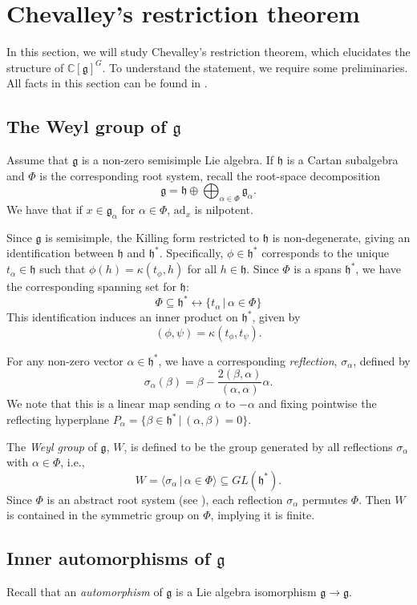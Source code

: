 \documentclass[12pt]{amsart}
\newcommand{\C}{\mathbb{C}}
\newcommand{\g}{\mathfrak{g}}
\newcommand{\h}{\mathfrak{h}}
\newcommand{\ad}{\mathrm{ad}}
\theoremstyle{remark}
\theoremstyle{remark}
\theoremstyle{remark}
\begin{document}
\section{Chevalley's restriction theorem}
In this section, we will study Chevalley's restriction theorem, which elucidates the structure of $\C[\g]^G$.
To understand the statement, we require some preliminaries.
All facts in this section can be found in \cite{Humphreys72}.

\subsection{The Weyl group of $\g$}
Assume that $\g$ is a non-zero semisimple Lie algebra.
If $\h$ is a Cartan subalgebra and $\Phi$ is the corresponding root system, recall the root-space decomposition
$$\g = \h \oplus \bigoplus_{\alpha \in \Phi} \g_\alpha.$$
We have that if $x \in \g_\alpha$ for $\alpha \in \Phi$, $\ad_x$ is nilpotent.

Since $\g$ is semisimple, the Killing form restricted to $\h$ is non-degenerate, giving an identification between $\h$ and $\h^*$.
Specifically, $\phi \in \h^*$ corresponds to the unique $t_\alpha \in \h$ such that $\phi(h) = \kappa(t_\phi, h)$ for all $h \in \h$.
Since $\Phi$ is a spans $\h^*$, we have the corresponding spanning set for $\h$:
$$\Phi \subseteq \h^* \longleftrightarrow \{t_\alpha \, | \, \alpha \in \Phi\}$$
This identification induces an inner product on $\h^*$, given by
$$(\phi, \psi) = \kappa(t_\phi, t_\psi).$$

For any non-zero vector $\alpha \in \h^*$, we have a corresponding \emph{reflection}, $\sigma_\alpha$, defined by
$$\sigma_\alpha(\beta) = \beta - \frac{2 (\beta, \alpha)}{(\alpha, \alpha)} \alpha.$$
We note that this is a linear map sending $\alpha$ to $-\alpha$ and fixing pointwise the reflecting hyperplane $P_\alpha = \{\beta \in \h^*\, | \, (\alpha, \beta)=0\}.$

The \emph{Weyl group} of $\g$, $W$, is defined to be the group generated by all reflections $\sigma_\alpha$ with $\alpha \in \Phi$, i.e.,
$$W =\langle \sigma_\alpha \, | \, \alpha \in \Phi \rangle \subseteq GL(\h^*).$$
Since $\Phi$ is an abstract root system (see \cite[\S 9.2]{Humphreys72}), each reflection $\sigma_\alpha$ permutes $\Phi$.
Then $W$ is contained in the symmetric group on $\Phi$, implying it is finite.

\subsection{Inner automorphisms of $\g$}
Recall that an \emph{automorphism} of $\g$ is a Lie algebra isomorphism $\g \to \g$.
\end{document}
